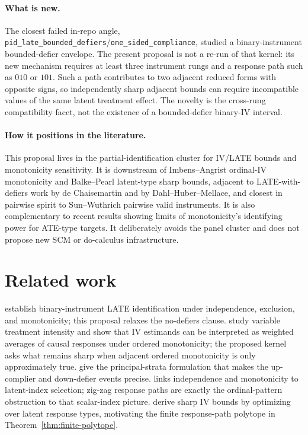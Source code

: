 \documentclass[11pt]{article}
\theoremstyle{definition}
\theoremstyle{plain}
\theoremstyle{remark}
\begin{document}
\paragraph{What is new.}
The closest failed in-repo angle, \texttt{pid\_late\_bounded\_defiers}/\texttt{one\_sided\_compliance}, studied a binary-instrument bounded-defier envelope.  The present proposal is not a re-run of that kernel: its new mechanism requires at least three instrument rungs and a response path such as \(010\) or \(101\).  Such a path contributes to two adjacent reduced forms with opposite signs, so independently sharp adjacent bounds can require incompatible values of the same latent treatment effect.  The novelty is the cross-rung compatibility facet, not the existence of a bounded-defier binary-IV interval.

\paragraph{How it positions in the literature.}
This proposal lives in the partial-identification cluster for IV/LATE bounds and monotonicity sensitivity.  It is downstream of Imbens--Angrist ordinal-IV monotonicity and Balke--Pearl latent-type sharp bounds, adjacent to LATE-with-defiers work by de Chaisemartin and by Dahl--Huber--Mellace, and closest in pairwise spirit to Sun--Wuthrich pairwise valid instruments.  It is also complementary to recent results showing limits of monotonicity's identifying power for ATE-type targets.  It deliberately avoids the panel cluster and does not propose new SCM or do-calculus infrastructure.

\section{Related work}
\citet{ImbensAngrist1994} establish binary-instrument LATE identification under independence, exclusion, and monotonicity; this proposal relaxes the no-defiers clause.  \citet{AngristImbens1995} study variable treatment intensity and show that IV estimands can be interpreted as weighted averages of causal responses under ordered monotonicity; the proposed kernel asks what remains sharp when adjacent ordered monotonicity is only approximately true.  \citet{AngristImbensRubin1996} give the principal-strata formulation that makes the up-complier and down-defier events precise.  \citet{Vytlacil2002} links independence and monotonicity to latent-index selection; zig-zag response paths are exactly the ordinal-pattern obstruction to that scalar-index picture.  \citet{BalkePearl1997} derive sharp IV bounds by optimizing over latent response types, motivating the finite response-path polytope in Theorem~\ref{thm:finite-polytope}.
\end{document}
